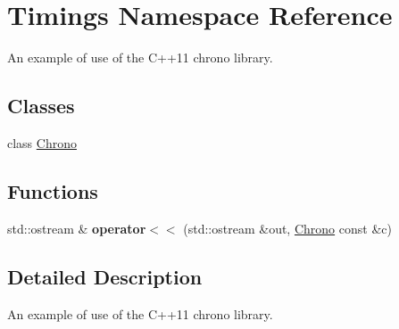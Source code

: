 \hypertarget{namespaceTimings}{
\section{Timings Namespace Reference}
\label{namespaceTimings}
}


An example of use of the C++11 chrono library.  
\subsection*{Classes}
\begin{DoxyCompactItemize}
\item 
class \hyperlink{classTimings_1_1Chrono}{Chrono}
\end{DoxyCompactItemize}
\subsection*{Functions}
\begin{DoxyCompactItemize}
\item 
\hypertarget{namespaceTimings_ae4d3f07fac5d71e6572344ebe1858e62}{
std::ostream \& {\bfseries operator$<$$<$} (std::ostream \&out, \hyperlink{classTimings_1_1Chrono}{Chrono} const \&c)}
\label{namespaceTimings_ae4d3f07fac5d71e6572344ebe1858e62}

\end{DoxyCompactItemize}


\subsection{Detailed Description}
An example of use of the C++11 chrono library. 